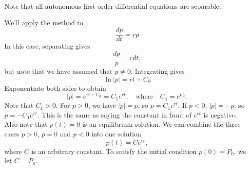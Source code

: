 Note that all autonomous first order differential equations are separable.

\begin{xexample}
We'll apply the method to
\begin{equation}
   \frac{dp}{dt} = r p
\end{equation}
In this case, separating gives
\begin{equation}
   \frac{dp}{p} = r dt,
\end{equation}
but note that we have assumed that $p\ne 0$.
Integrating gives
\begin{equation}
   \ln | p | = rt+C_0
\end{equation}
Exponentiate both sides to obtain
\begin{equation}
  |p| = e^{rt+C_0} = C_1e^{rt}, \quad \textrm{where} \quad C_1 = e^{C_0}.
\end{equation}
Note that $C_1 > 0$.
For $p > 0$, we have $|p|=p$, so $p=C_1e^{rt}$.
If $p < 0$, $|p| = -p$, so $p = -C_1e^{rt}$.
This is the same as saying the constant in front of $e^{rt}$ is negative.
Also note that $p(t)=0$ is an equilibrium solution.
We can combine the three cases $p>0$, $p=0$ and $p<0$ into one
solution
\begin{equation}
   p(t) = Ce^{rt},
\end{equation}
where $C$ is an arbitrary constant.
To satisfy the initial condition $p(0)=P_0$, we let $C=P_0$.
\end{xexample}

